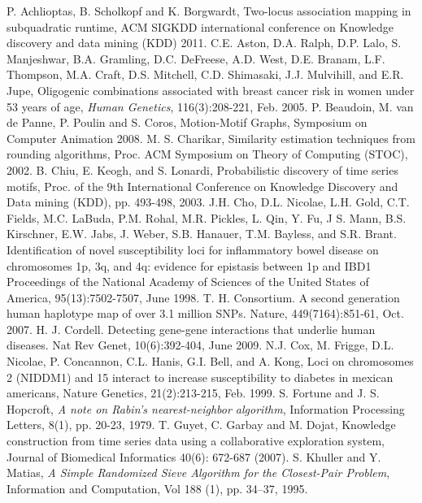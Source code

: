 \documentclass{article}
\theoremstyle{definition}
\theoremstyle{remark}
\begin{document}

\begin{thebibliography}{}
P. Achlioptas, B. Scholkopf and K. Borgwardt, Two-locus association mapping in subquadratic runtime, ACM SIGKDD international conference on Knowledge discovery and data mining (KDD) 2011.
C.E. Aston, D.A. Ralph, D.P. Lalo, S. Manjeshwar, B.A. Gramling, D.C. DeFreese, A.D. West, D.E. Branam, L.F. Thompson, M.A. Craft, D.S. Mitchell, C.D. Shimasaki, J.J. Mulvihill, and E.R. Jupe, Oligogenic combinations associated with breast cancer risk in women under 53 years of age, {\em Human Genetics}, 116(3):208-221, Feb. 2005.
P. Beaudoin, M. van de Panne, P. Poulin and S. Coros, Motion-Motif Graphs, Symposium on Computer Animation 2008.
M. S. Charikar, Similarity estimation techniques from rounding algorithms, Proc. ACM Symposium on Theory of Computing (STOC), 2002.
B. Chiu, E. Keogh, and S. Lonardi, Probabilistic discovery of time series motifs, Proc. of the 9th International Conference on Knowledge Discovery and Data mining (KDD), pp. 493-498, 2003.
J.H. Cho, D.L. Nicolae, L.H. Gold, C.T. Fields, M.C. LaBuda, P.M. Rohal, M.R. Pickles, L. Qin,
Y. Fu, J S. Mann, B.S. Kirschner, E.W. Jabs, J. Weber, S.B. Hanauer, T.M. Bayless, and S.R. Brant. Identification of novel susceptibility loci for inflammatory bowel disease on chromosomes 1p, 3q, and 4q: evidence for epistasis between 1p and IBD1 Proceedings of the National Academy of Sciences of the United States of America, 95(13):7502-7507, June 1998.
T. H. Consortium. A second generation human haplotype map of over 3.1 million SNPs. Nature, 449(7164):851-61, Oct. 2007.
H. J. Cordell. Detecting gene-gene interactions that underlie human diseases. Nat Rev Genet, 10(6):392-404, June 2009.
N.J. Cox, M. Frigge, D.L. Nicolae, P. Concannon, C.L. Hanis, G.I. Bell, and A. Kong, Loci on chromosomes 2 (NIDDM1) and 15 interact to increase susceptibility to diabetes in mexican americans, Nature Genetics, 21(2):213-215, Feb. 1999.
S. Fortune and J. S. Hopcroft, \emph{A note on Rabin's nearest-neighbor algorithm}, Information Processing Letters, 8(1), pp. 20-23, 1979.
T. Guyet, C. Garbay and M. Dojat, Knowledge construction from time series data using a collaborative exploration system, Journal of Biomedical Informatics 40(6): 672-687 (2007).
S. Khuller and Y. Matias, \emph{A Simple Randomized Sieve Algorithm for the Closest-Pair Problem}, Information and Computation, Vol 188 (1), pp. 34--37, 1995.

\end{thebibliography}
\end{document}
